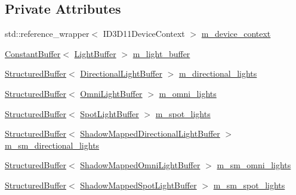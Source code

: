 \subsection*{Private Attributes}
\begin{DoxyCompactItemize}
\item 
std\+::reference\+\_\+wrapper$<$ I\+D3\+D11\+Device\+Context $>$ \hyperlink{classmage_1_1rendering_1_1_l_buffer_pass_adccb16b406d2020a7608512cc0f9e6d0}{m\+\_\+device\+\_\+context}
\item 
\hyperlink{classmage_1_1rendering_1_1_constant_buffer}{Constant\+Buffer}$<$ \hyperlink{structmage_1_1rendering_1_1_light_buffer}{Light\+Buffer} $>$ \hyperlink{classmage_1_1rendering_1_1_l_buffer_pass_ab80d18b8193e90588afa5e992b5b1af8}{m\+\_\+light\+\_\+buffer}
\item 
\hyperlink{classmage_1_1rendering_1_1_structured_buffer}{Structured\+Buffer}$<$ \hyperlink{structmage_1_1rendering_1_1_directional_light_buffer}{Directional\+Light\+Buffer} $>$ \hyperlink{classmage_1_1rendering_1_1_l_buffer_pass_a46bc97b1576c1f1702d26c827785c343}{m\+\_\+directional\+\_\+lights}
\item 
\hyperlink{classmage_1_1rendering_1_1_structured_buffer}{Structured\+Buffer}$<$ \hyperlink{structmage_1_1rendering_1_1_omni_light_buffer}{Omni\+Light\+Buffer} $>$ \hyperlink{classmage_1_1rendering_1_1_l_buffer_pass_af7bc4d8ed4d667aa8e6375d6f243d900}{m\+\_\+omni\+\_\+lights}
\item 
\hyperlink{classmage_1_1rendering_1_1_structured_buffer}{Structured\+Buffer}$<$ \hyperlink{structmage_1_1rendering_1_1_spot_light_buffer}{Spot\+Light\+Buffer} $>$ \hyperlink{classmage_1_1rendering_1_1_l_buffer_pass_abc2a2704d99a2a5335d28f3039d600ca}{m\+\_\+spot\+\_\+lights}
\item 
\hyperlink{classmage_1_1rendering_1_1_structured_buffer}{Structured\+Buffer}$<$ \hyperlink{structmage_1_1rendering_1_1_shadow_mapped_directional_light_buffer}{Shadow\+Mapped\+Directional\+Light\+Buffer} $>$ \hyperlink{classmage_1_1rendering_1_1_l_buffer_pass_acbb9492defc1f8e040d95d28988d595f}{m\+\_\+sm\+\_\+directional\+\_\+lights}
\item 
\hyperlink{classmage_1_1rendering_1_1_structured_buffer}{Structured\+Buffer}$<$ \hyperlink{structmage_1_1rendering_1_1_shadow_mapped_omni_light_buffer}{Shadow\+Mapped\+Omni\+Light\+Buffer} $>$ \hyperlink{classmage_1_1rendering_1_1_l_buffer_pass_a3f32431790f55b3959713ae44c1847f9}{m\+\_\+sm\+\_\+omni\+\_\+lights}
\item 
\hyperlink{classmage_1_1rendering_1_1_structured_buffer}{Structured\+Buffer}$<$ \hyperlink{structmage_1_1rendering_1_1_shadow_mapped_spot_light_buffer}{Shadow\+Mapped\+Spot\+Light\+Buffer} $>$ \hyperlink{classmage_1_1rendering_1_1_l_buffer_pass_aea554100305b5a5b198cfd579999fe8a}{m\+\_\+sm\+\_\+spot\+\_\+lights}

\end{DoxyCompactItemize}
